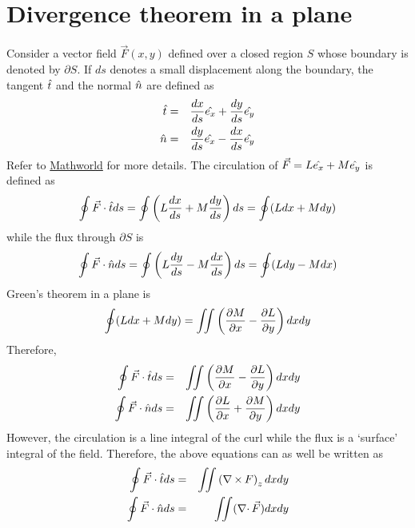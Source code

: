 \section{Divergence theorem in a plane}\label{c2sa9} 
Consider a vector field $\vec{F}(x, y)$ defined over a closed region $S$ whose boundary is denoted by $\partial S$. If $ds$ denotes a small displacement along the boundary, the tangent
$\hat{t}$ and the normal $\hat{n}$ are defined as
\begin{eqnarray*}
\hat{t} &=& \frac{d{x}}{d{s}}\hat{e_{x}} + \frac{d{y}}{d{s}}\hat{e_{y}} \\
\hat{n}     &=& \frac{d{y}}{d{s}}\hat{e_{x}} - \frac{d{x}}{d{s}}\hat{e_{y}}
\end{eqnarray*}
Refer to \href{http://mathworld.wolfram.com/NormalVector.html}{Mathworld} for more details. The circulation of $\vec{F} = L\hat{e_{x}} + M\hat{e_{y}}$ is defined as
\[
\oint\vec{F}\cdot\hat{t} ds = \oint\left(L\frac{d{x}}{d{s}} + M\frac{d{y}}{d{s}}\right)ds = \oint(Ldx + Mdy)
\]
while the flux through $\partial S$ is
\[
\oint\vec{F}\cdot\hat{n} ds = \oint\left(L\frac{d{y}}{d{s}} - M\frac{d{x}}{d{s}}\right)ds = \oint(Ldy - Mdx)
\]
Green's theorem in a plane is
\[
\oint (Ldx + Mdy) = \iint \left(\frac{\partial{M}}{\partial{x}} - \frac{\partial{L}}{\partial{y}}\right) dxdy
\]
Therefore,
\begin{eqnarray*}
\oint\vec{F}\cdot\hat{t} ds &=& \iint\left(\frac{\partial{M}}{\partial{x}} - \frac{\partial{L}}{\partial{y}}\right)dxdy \\
\oint\vec{F}\cdot\hat{n} ds     &=& \iint\left(\frac{\partial{L}}{\partial{x}} + \frac{\partial{M}}{\partial{y}}\right)dxdy
\end{eqnarray*}
However, the circulation is a line integral of the curl while the flux is a \enquote*{surface} integral of the field. Therefore, the above equations can as well be written as
\begin{eqnarray*}
\oint\vec{F}\cdot\hat{t} ds &=& \iint\left(\operatorname{\nabla\operatorname{\times}}{F}\right)_zdxdy \\
\oint\vec{F}\cdot\hat{n} ds     &=& \iint(\operatorname{\nabla\cdot}{\vec{F}})dxdy
\end{eqnarray*}

